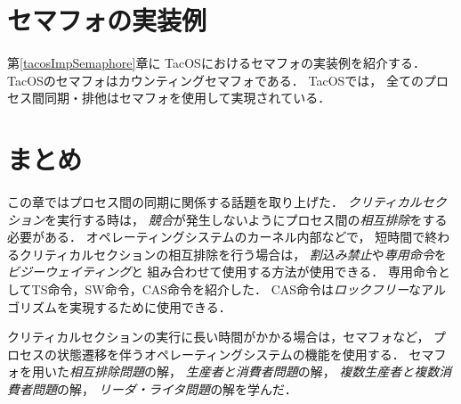 \section{セマフォの実装例}
第\ref{tacosImpSemaphore}章に
TacOSにおけるセマフォの実装例を紹介する．
TacOSのセマフォはカウンティングセマフォである．
TacOSでは，
全てのプロセス間同期・排他はセマフォを使用して実現されている．

\section{まとめ}
この章ではプロセス間の同期に関係する話題を取り上げた．
\emph{クリティカルセクション}を実行する時は，
\emph{競合}が発生しないようにプロセス間の\emph{相互排除}をする必要がある．
オペレーティングシステムのカーネル内部などで，
短時間で終わるクリティカルセクションの相互排除を行う場合は，
\emph{割込み禁止}や\emph{専用命令}を\emph{ビジーウェイティング}と
組み合わせて使用する方法が使用できる．
専用命令としてTS命令，SW命令，CAS命令を紹介した．
CAS命令は\emph{ロックフリー}なアルゴリズムを実現するために使用できる．

クリティカルセクションの実行に長い時間がかかる場合は，セマフォなど，
プロセスの状態遷移を伴うオペレーティングシステムの機能を使用する．
セマフォを用いた\emph{相互排除問題}の解，
\emph{生産者と消費者問題}の解，
\emph{複数生産者と複数消費者問題}の解，
\emph{リーダ・ライタ問題}の解を学んだ．

\newpage
